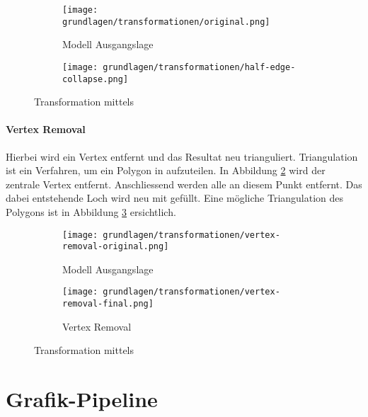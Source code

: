 \begin{figure}[H]
  \centering
  \begin{subfigure}{.5\textwidth}
    \centering
    \texttt{[image: grundlagen/transformationen/original.png]}
    \caption{Modell Ausgangslage}
  \end{subfigure}%
  \begin{subfigure}{.5\textwidth}
    \centering
    \texttt{[image: grundlagen/transformationen/half-edge-collapse.png]}
    \caption{}
  \end{subfigure}
  \caption{Transformation mittels }
  \label{fig:transformationHalfedgeCollapse}
\end{figure}

\paragraph{Vertex Removal}
Hierbei wird ein Vertex entfernt und das Resultat neu trianguliert. Triangulation ist ein Verfahren, um ein Polygon in  aufzuteilen.
In Abbildung \ref{fig:transformationVertexRemovalOriginal} wird der zentrale Vertex entfernt. Anschliessend werden alle  an diesem Punkt entfernt. Das dabei entstehende Loch wird neu mit  gefüllt. Eine mögliche Triangulation des Polygons ist in Abbildung \ref{fig:transformationVertexRemovalFinal} ersichtlich.

\begin{figure}[H]
  \centering
  \begin{subfigure}{.5\textwidth}
    \centering
    \texttt{[image: grundlagen/transformationen/vertex-removal-original.png]}
    \caption{Modell Ausgangslage}
    \label{fig:transformationVertexRemovalOriginal}
  \end{subfigure}%
  \begin{subfigure}{.5\textwidth}
    \centering
    \texttt{[image: grundlagen/transformationen/vertex-removal-final.png]}
    \caption{Vertex Removal}
    \label{fig:transformationVertexRemovalFinal}
  \end{subfigure}
  \caption{Transformation mittels }
  \label{fig:transformationVertexRemoval}
\end{figure}

\section{Grafik-Pipeline}


